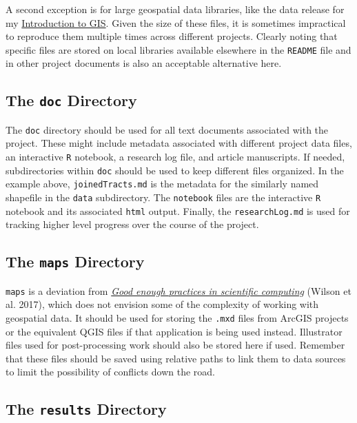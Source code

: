 \documentclass[]{book}
\theoremstyle{definition}
\theoremstyle{definition}
\theoremstyle{definition}
\theoremstyle{remark}
\begin{document}
A second exception is for large geospatial data libraries, like the data
release for my \href{https://slu-soc5650.github.io}{Introduction to
GIS}. Given the size of these files, it is sometimes impractical to
reproduce them multiple times across different projects. Clearly noting
that specific files are stored on local libraries available elsewhere in
the \texttt{README} file and in other project documents is also an
acceptable alternative here.

\subsection{\texorpdfstring{The \texttt{doc}
Directory}{The doc Directory}}\label{the-doc-directory}

The \texttt{doc} directory should be used for all text documents
associated with the project. These might include metadata associated
with different project data files, an interactive \texttt{R} notebook, a
research log file, and article manuscripts. If needed, subdirectories
within \texttt{doc} should be used to keep different files organized. In
the example above, \texttt{joinedTracts.md} is the metadata for the
similarly named shapefile in the \texttt{data} subdirectory. The
\texttt{notebook} files are the interactive \texttt{R} notebook and its
associated \texttt{html} output. Finally, the \texttt{researchLog.md} is
used for tracking higher level progress over the course of the project.

\subsection{\texorpdfstring{The \texttt{maps}
Directory}{The maps Directory}}\label{the-maps-directory}

\texttt{maps} is a deviation from
\href{http://journals.plos.org/ploscompbiol/article?id=10.1371/journal.pcbi.1005510}{\emph{Good
enough practices in scientific computing}} (Wilson et al. 2017), which
does not envision some of the complexity of working with geospatial
data. It should be used for storing the \texttt{.mxd} files from ArcGIS
projects or the equivalent QGIS files if that application is being used
instead. Illustrator files used for post-processing work should also be
stored here if used. Remember that these files should be saved using
relative paths to link them to data sources to limit the possibility of
conflicts down the road.

\subsection{\texorpdfstring{The \texttt{results}
Directory}{The results Directory}}\label{the-results-directory}
\end{document}
